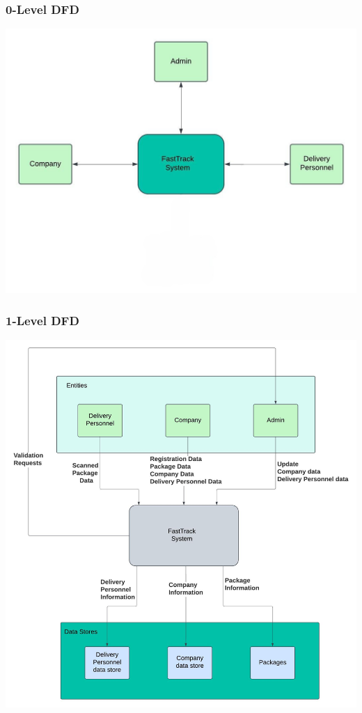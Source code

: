 \documentclass{article}
\begin{document}
\subsubsection{0-Level DFD}
\includegraphics[scale=1.0]{Level 0 Data Flow.jpeg}
\subsubsection{1-Level DFD}
\includegraphics[scale=0.6]{Level 1 Data Flow.jpeg}
\newpage
\end{document}
